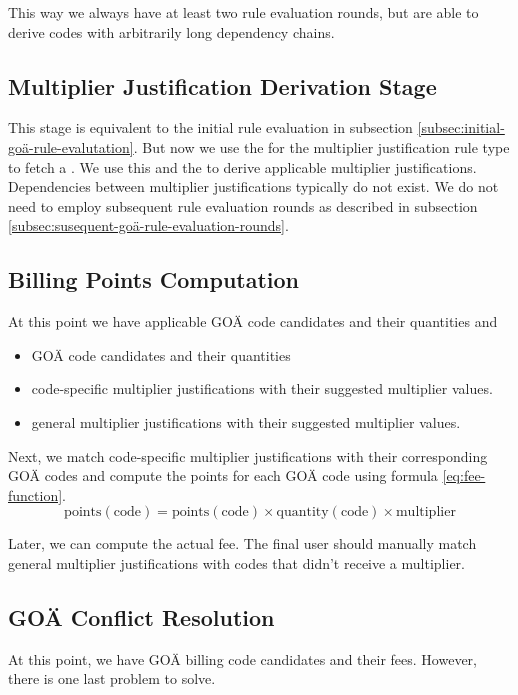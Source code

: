 This way we always have at least two rule evaluation rounds,
but are able to derive codes with arbitrarily long  dependency chains.

\subsection{Multiplier Justification Derivation Stage}\label{subsec:multiplier-justification-derivation-stage}
This stage is equivalent to the initial rule evaluation in subsection \ref{subsec:initial-goä-rule-evalutation}.
But now we use the \REIF for the multiplier justification rule type to fetch a \REI.
We use this \REI and the  to derive applicable multiplier justifications.
Dependencies between multiplier justifications typically do not exist.
We do not need to employ subsequent rule evaluation rounds as described in subsection \ref{subsec:susequent-goä-rule-evaluation-rounds}.

\subsection{Billing Points Computation}\label{subsec:fee-computation}
At this point we have applicable GOÄ code candidates and their quantities and
\begin{itemize}
    \item GOÄ code candidates and their quantities
    \item code-specific multiplier justifications with their suggested multiplier values.
    \item general multiplier justifications with their suggested multiplier values.
\end{itemize}
Next, we match code-specific multiplier justifications with their corresponding GOÄ codes and compute the points for each GOÄ code using formula \ref{eq:fee-function}.
\begin{equation}\label{eq:fee-function}
    \text{points}\left(\text{code}\right) = \text{points}\left(\text{code}\right) \times \text{quantity}\left(\text{code}\right) \times \text{multiplier}
\end{equation}

Later, we can compute the actual fee.
The final user should manually match general multiplier justifications with codes that didn't receive a multiplier.


\subsection{GOÄ Conflict Resolution}\label{subsec:goä-conflict-resolution}
At this point, we have GOÄ billing code candidates and their fees.
However, there is one last problem to solve.


